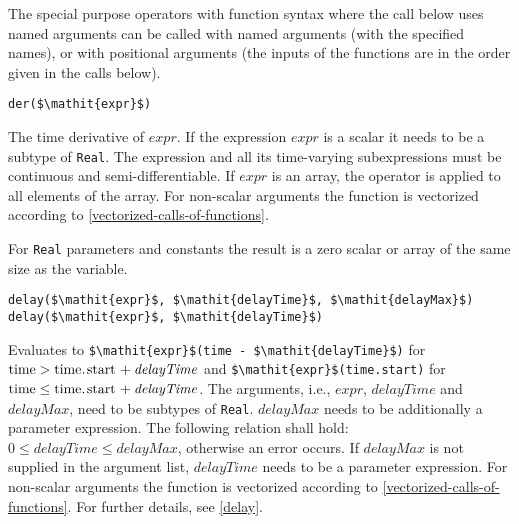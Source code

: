 The special purpose operators with function syntax where the call below uses named arguments can be called with named arguments (with the specified names), or with positional arguments (the inputs of the functions are in the order given in the calls below).

\begin{operatordefinition}[der]
\begin{synopsis}\begin{lstlisting}
der($\mathit{expr}$)
\end{lstlisting}\end{synopsis}
\begin{semantics}
The time derivative of $\mathit{expr}$.
If the expression $\mathit{expr}$ is a scalar it needs to be a subtype of \lstinline!Real!.
The expression and all its time-varying subexpressions must be continuous and semi-differentiable.
If $\mathit{expr}$ is an array, the operator is applied to all elements of the array.
For non-scalar arguments the function is vectorized according to \cref{vectorized-calls-of-functions}.
\begin{nonnormative}
For \lstinline!Real! parameters and constants the result is a zero scalar or array of the same size as the variable.
\end{nonnormative}
\end{semantics}
\end{operatordefinition}

\begin{operatordefinition}[delay]
\begin{synopsis}\begin{lstlisting}
delay($\mathit{expr}$, $\mathit{delayTime}$, $\mathit{delayMax}$)
delay($\mathit{expr}$, $\mathit{delayTime}$)
\end{lstlisting}\end{synopsis}
\begin{semantics}
Evaluates to \lstinline!$\mathit{expr}$(time - $\mathit{delayTime}$)! for $\text{\lstinline!time!} > \text{\lstinline!time.start!} + \mathit{delayTime}$ and \lstinline!$\mathit{expr}$(time.start)! for $\text{\lstinline!time!} \leq \text{\lstinline!time.start!} + \mathit{delayTime}$.
The arguments, i.e., $\mathit{expr}$, $\mathit{delayTime}$ and $\mathit{delayMax}$, need to be subtypes of \lstinline!Real!.
$\mathit{delayMax}$ needs to be additionally a parameter expression.
The following relation shall hold: $0 \leq \mathit{delayTime} \leq \mathit{delayMax}$, otherwise an error occurs.
If $\mathit{delayMax}$ is not supplied in the argument list, $\mathit{delayTime}$ needs to be a parameter expression.
For non-scalar arguments the function is vectorized according to \cref{vectorized-calls-of-functions}.
For further details, see \cref{delay}.
\end{semantics}
\end{operatordefinition}

